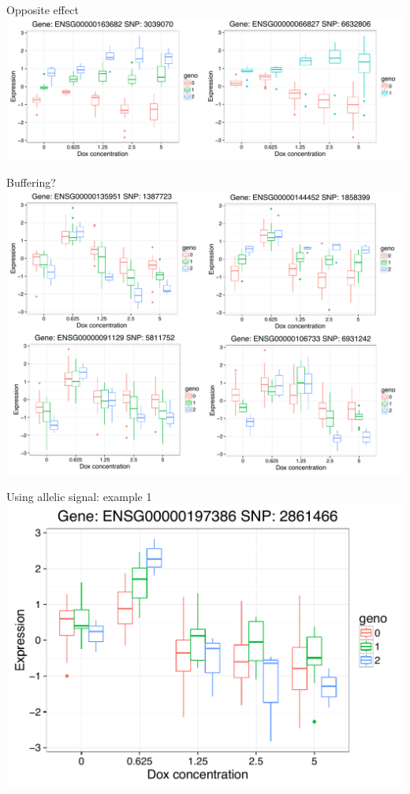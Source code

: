 \documentclass{beamer}
\begin{document}
\begin{frame}{Opposite effect}
\centering
\includegraphics[width=\textwidth,clip,trim=0 0 0 0]{../figures/iqtl_types/opposite_effect.pdf}
\end{frame}

\begin{frame}{Buffering?}
\centering
\includegraphics[width=\textwidth,clip,trim=0 0 0 0]{../figures/iqtl_types/buffering.pdf}
\end{frame}

\begin{frame}{Using allelic signal: example 1}
\centering
\includegraphics[width=\textwidth,clip,trim=0 0 0 0]{../figures/ENSG00000197386.pdf}
\end{frame}
\end{document}
